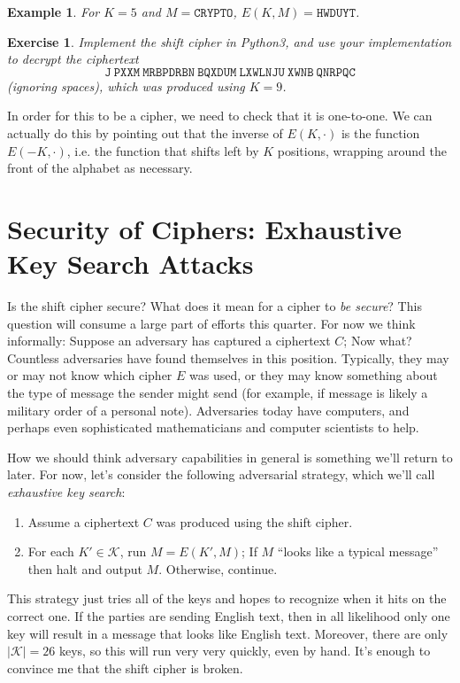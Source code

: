 \documentclass[11pt]{article}
\newtheorem{exercise}{Exercise}
\newtheorem{example}{Example}
\newcommand{\keys}{\mathcal{K}}
\newcommand{\enc}{E}
\begin{document}
\begin{example}
    For $K=5$ and $M=\mathtt{CRYPTO}$, $\enc(K,M)=\mathtt{HWDUYT}$.
\end{example}

\begin{exercise}
    Implement the shift cipher in Python3, and use your implementation
    to decrypt the ciphertext 
    \[
        \mathtt{J\ PXXM\ MRBPDRBN\ BQXDUM\ LXWLNJU\ XWNB\ QNRPQC}
    \]
    (ignoring spaces), which was produced using $K=9$.
\end{exercise}

In order for this to be a cipher, we need to check that it is one-to-one.
We can actually do this by pointing out that the inverse of $\enc(K,\cdot)$
is the function $\enc(-K,\cdot)$, i.e. the function that shifts left by
$K$ positions, wrapping around the front of the alphabet as necessary.

\section{Security of Ciphers: Exhaustive Key Search Attacks}

Is the shift cipher secure? What does it mean for a cipher to \emph{be secure}?
This question will consume a large part of efforts this quarter. For now we
think informally: Suppose an adversary has captured a ciphertext $C$; Now what?
Countless adversaries have found themselves in this position. Typically,
they may or may not know which cipher $\enc$ was used, or they may know
something about the type of message the sender might send (for example,
if message is likely a military order of a personal note). Adversaries
today have computers, and perhaps even sophisticated mathematicians and
computer scientists to help. 

How we should think adversary capabilities in general is something we'll return
to later. For now, let's consider the following adversarial strategy, which
we'll call \emph{exhaustive key search}: 
\begin{enumerate}
    \item Assume a ciphertext $C$ was produced using the shift cipher. 
        
    \item For each $K'\in\keys$, run $M = \enc(K',M)$; If $M$ ``looks like
        a typical message'' then halt and output $M$. Otherwise, continue.
\end{enumerate}
This strategy just tries all of the keys and hopes to recognize when it hits on
the correct one. If the parties are sending English text, then in all
likelihood only one key will result in a message that looks like English text.
Moreover, there are only $|\keys|=26$ keys, so this will run very very quickly,
even by hand.  It's enough to convince me that the shift cipher is broken.
\end{document}
